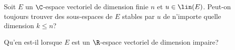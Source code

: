 \begin{enonce}
\begin{exercise}[ID={RMS 128 E655},subtitle={Mines-Ponts PSI 2017},tags={}]
  Soit $E$ un $\C$-espace vectoriel de dimension finie $n$ et $u\in\lin(E)$.
  Peut-on toujours trouver des sous-espaces de $E$ stables par $u$ de n'importe quelle dimension $k\leq n$?

  Qu'en est-il lorsque $E$ est un $\R$-espace vectoriel de dimension impaire?
\end{exercise}
\begin{solution}
\end{solution}
\end{enonce}
